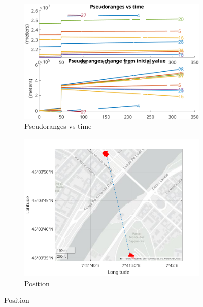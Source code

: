        \begin{figure}[h!]
            \centering
            \begin{subfigure}{0.23\textwidth}
                \includegraphics[width=\textwidth]{images/tests/Monte_Cappuccini/Spoofing/task6_figures/Samsung_A51_Monte_Cappuccini_fig1.png}
                \caption{Pseudoranges vs time}
                \label{fig:Delay_a}
            \end{subfigure}
            \hfill
            \begin{subfigure}{0.23\textwidth}
                \includegraphics[width=\textwidth]{images/tests/Monte_Cappuccini/Spoofing/task6_figures/Samsung_A51_Monte_Cappuccini_fig6.png}
                \caption{Position}
                \label{fig:Delay_b}
            \end{subfigure}

\end{figure}

